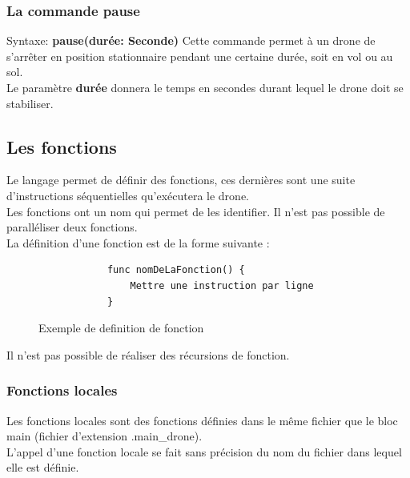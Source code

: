 \documentclass[12pt]{article}
\begin{document}
	\subsubsection{La commande pause}
		\quad Syntaxe: \textbf{pause(durée: Seconde)}  \bigbreak
			Cette commande permet à un drone de s'arrêter en position stationnaire pendant une certaine durée, soit en vol ou au sol. \\
			Le paramètre \textbf{durée} donnera le temps en secondes durant lequel le drone doit se stabiliser. \\
	
\subsection{Les fonctions}
Le langage permet de définir des fonctions, ces dernières sont une suite d'instructions séquentielles qu'exécutera le drone.\\
Les fonctions ont un nom qui permet de les identifier.
Il n'est pas possible de paralléliser deux fonctions.\\
La définition d'une fonction est de la forme suivante :

    \begin{figure}[h!]
        \begin{center}
            \begin{verbatim}
            func nomDeLaFonction() {
                Mettre une instruction par ligne
            }
            \end{verbatim}
        \end{center}
        \caption{Exemple de definition de fonction}
        \label{Exemple de definition de fonction}
    \end{figure}
    
Il n'est pas possible de réaliser des récursions de fonction. 
	\subsubsection{Fonctions locales}
	
	Les fonctions locales sont des fonctions définies dans le même fichier que le bloc main (fichier d'extension .main\_drone). \\
	L'appel d'une fonction locale se fait sans précision du nom du fichier dans lequel elle est définie.
	
\end{document}
